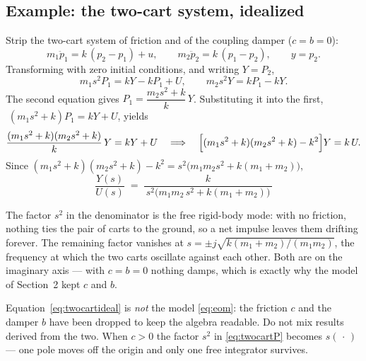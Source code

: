 \documentclass[11pt]{article}
\begin{document}
\subsection{Example: the two-cart system, idealized}\label{sec:twocarttf}
Strip the two-cart system of friction and of the coupling damper ($c=b=0$):
\begin{equation}\label{eq:twocartideal}
   m_1\ddot p_1 = k\,(p_2-p_1) + u,\qquad
   m_2\ddot p_2 = k\,(p_1-p_2),\qquad y=p_2 .
\end{equation}
Transforming with zero initial conditions, and writing $Y=P_2$,
\[
   m_1 s^{2}P_1 = kY - kP_1 + U,\qquad
   m_2 s^{2}Y = kP_1 - kY .
\]
The second equation gives $P_1 = \dfrac{m_2s^{2}+k}{k}\,Y$. Substituting it into
the first, $\;(m_1s^{2}+k)P_1 = kY+U$, yields
\[
   \frac{(m_1s^{2}+k)(m_2s^{2}+k)}{k}\,Y = kY + U
   \quad\Longrightarrow\quad
   \Bigl[(m_1s^{2}+k)(m_2s^{2}+k) - k^{2}\Bigr]Y = k\,U .
\]
Since $(m_1s^{2}+k)(m_2s^{2}+k)-k^{2} = s^{2}\bigl(m_1m_2s^{2}+k(m_1+m_2)\bigr)$,
\begin{equation}\label{eq:twocartP}
   \boxed{\;
   \frac{Y(s)}{U(s)} \;=\; \frac{k}{\,s^{2}\bigl(m_1m_2\,s^{2}+k(m_1+m_2)\bigr)\,}\;}
\end{equation}

\begin{remark}
The factor $s^{2}$ in the denominator is the free rigid-body mode: with no
friction, nothing ties the pair of carts to the ground, so a net impulse leaves
them drifting forever. The remaining factor vanishes at
$s = \pm j\sqrt{k(m_1+m_2)/(m_1m_2)}$, the frequency at which the two carts
oscillate against each other. Both are on the imaginary axis --- with $c=b=0$
nothing damps, which is exactly why the model of Section~2 kept $c$ and $b$.
\end{remark}

\begin{caution}
Equation~\eqref{eq:twocartideal} is \emph{not} the model \eqref{eq:eom}: the
friction $c$ and the damper $b$ have been dropped to keep the algebra readable.
Do not mix results derived from the two. When $c>0$ the factor $s^{2}$ in
\eqref{eq:twocartP} becomes $s(\,\cdot\,)$ --- one pole moves off the origin and
only one free integrator survives.
\end{caution}
\end{document}
